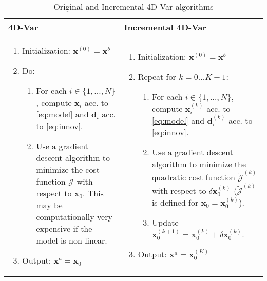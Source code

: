 \documentclass[a4paper,10pt]{article}
\newcommand{\MJ}{\mathcal J}
\newcommand{\bx}{{\boldsymbol x}}
\newcommand{\bd}{{\boldsymbol d}}
\newcommand{\dx}{\delta \bx}
\newcommand{\TJ}{\widetilde{\MJ}}
\newcommand{\bxstep}[1]{\bx^{(#1)}}
\newcommand{\dxstep}[1]{\dx^{(#1)}}
\newcommand{\bdstep}[1]{\bd^{(#1)}}
\newcommand{\bxz}{\bxstep{0}}
\newcommand{\bxk}{\bxstep{k}}
\newcommand{\dxk}{\dxstep{k}}
\newcommand{\bdk}{\bdstep{k}}
\newcommand{\TJk}{\TJ^{(k)}}
\newcommand{\ioton}{i \in \{1, \dots, N\}}
\begin{document}
\begin{table}[ht]
	\begin{tabularx}{\textwidth}{XX}
		\textbf{4D-Var} & \textbf{Incremental 4D-Var} \\
		\hline
		\begin{enumerate}
			\item Initialization: $\bxz = \bx^b$
			
			\item Do:
			\begin{enumerate}
				\item For each $\ioton$, compute $\bx_i$ acc. to \eqref{eq:model} and $\bd_i$ acc. to \eqref{eq:innov}.
				
				\item Use a gradient descent algorithm to minimize the cost function $\MJ$ with respect to $\bx_0$. This may be computationally very expensive if the model is non-linear.
			\end{enumerate}
			
			\item Output: $\bx^a = \bx_0$
		\end{enumerate}  &
		\begin{enumerate}
			\item Initialization: $\bxz = \bx^b$
			
			\item Repeat for $k = 0 \dots K-1$:
			\begin{enumerate}
				\item For each $\ioton$, compute $\bxk_i$ acc. to \eqref{eq:model} and $\bdk_i$ acc. to \eqref{eq:innov}.
				
				\item Use a gradient descent algorithm to minimize the quadratic cost function $\TJk$ with respect to $\dxk_0$ ($\TJk$ is defined for $\bx_0 = \bxk_0$). 
				
				
				\item Update $\bxstep{k+1}_0 = \bxk_0 + \dxk_0$.
			\end{enumerate}
		
			\item Output: $\bx^a = \bxstep{K}_0$
		\end{enumerate} \\
		\hline
	\end{tabularx}
	\caption{Original and Incremental 4D-Var algorithms}
	\label{tab:4dvar}
\end{table}
\end{document}
